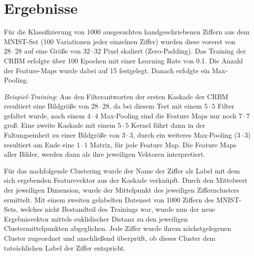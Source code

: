 \section{Ergebnisse}\label{results}
Für die Klassifizierung von 1000 ausgesuchten handgeschriebenen Ziffern aus dem MNIST-Set (100 Variationen jeder einzelnen Ziffer) wurden diese vorerst von $28 \cdot 28$ auf eine Größe von $32 \cdot 32$ Pixel skaliert (Zero-Padding).
Das Training der CRBM erfolgte über 100 Epochen mit einer Learning Rate von 0.1.
Die Anzahl der Feature-Maps wurde dabei auf 15 festgelegt.
Danach erfolgte ein Max-Pooling.

\textit{Beispiel-Training:}
Aus den Filterantworten der ersten Kaskade der CRBM resultiert eine Bildgröße von $28 \cdot 28$, da bei diesem Test mit einem $5 \cdot 5$ Filter gefaltet wurde, nach einem $4 \cdot 4$ Max-Pooling sind die Feature Maps nur noch $7 \cdot 7$ groß.
Eine zweite Kaskade mit einem  $5 \cdot 5$ Kernel führt dann in der Faltungseinheit zu einer Bildgröße von $3 \cdot 3$, durch ein weiteres Max-Pooling ($3 \cdot 3$) resultiert am Ende eine $1 \cdot 1$ Matrix, für jede Feature Map.
Die Feature Maps aller Bilder, werden dann als ihre jeweiligen Vektoren interpretiert.

Für das nachfolgende Clustering wurde der Name der Ziffer als Label mit dem sich ergebenden Featurevektor aus der Kaskade verknüpft. Durch den Mittelwert der jeweiligen Dimension, wurde der Mittelpunkt des jeweiligen Ziffernclusters ermittelt.
Mit einem zweiten gelabelten Datenset von 1000 Ziffern des MNIST-Sets, welches nicht Bestandteil des Trainings war, wurde nun der neue Ergebnisvektor mittels euklidischer Distanz zu den jeweiligen Clustermittelpunkten abgeglichen.
Jede Ziffer wurde ihrem nächstgelegenen Cluster zugeordnet und anschließend überprüft, ob dieses Cluster dem tatsächlichen Label der Ziffer entspricht.